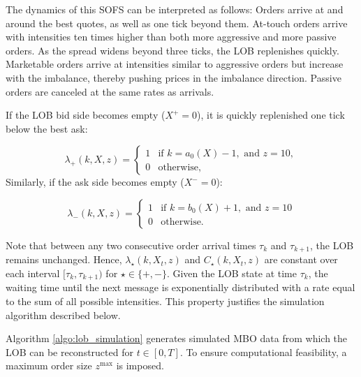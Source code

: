 \documentclass[10pt,a4paper,oneside]{article}
\providecommand{\DIFaddbegin}{} %
\providecommand{\DIFaddend}{} %
\providecommand{\DIFdelbegin}{} %
\providecommand{\DIFdelend}{} %
\newcommand{\DIFscaledelfig}{0.5}
\newlength{\DIFdelgraphicswidth} %
\newlength{\DIFdelgraphicsheight} %
\newcommand{\DIFaddincludegraphics}[2][]{{\color{blue}\fbox{\DIFOincludegraphics[#1]{#2}}}} %
\newcommand{\DIFdelincludegraphics}[2][]{%
\sbox{\DIFdelgraphicsbox}{\DIFOincludegraphics[#1]{#2}}%
\settoboxwidth{\DIFdelgraphicswidth}{\DIFdelgraphicsbox} %
\settoboxtotalheight{\DIFdelgraphicsheight}{\DIFdelgraphicsbox} %
\scalebox{\DIFscaledelfig}{%
\parbox[b]{\DIFdelgraphicswidth}{\usebox{\DIFdelgraphicsbox}\\[-\baselineskip] \rule{\DIFdelgraphicswidth}{0em}}\llap{\resizebox{\DIFdelgraphicswidth}{\DIFdelgraphicsheight}{%
\setlength{\unitlength}{\DIFdelgraphicswidth}%
\begin{picture}(1,1)%
\thicklines\linethickness{2pt} %
{\color[rgb]{1,0,0}\put(0,0){\framebox(1,1){}}}%
{\color[rgb]{1,0,0}\put(0,0){\line( 1,1){1}}}%
{\color[rgb]{1,0,0}\put(0,1){\line(1,-1){1}}}%
\end{picture}%
}\hspace*{3pt}}} %
} %
\DeclareRobustCommand{\DIFaddbegin}{\DIFOaddbegin \let\includegraphics\DIFaddincludegraphics} %
\DeclareRobustCommand{\DIFaddend}{\DIFOaddend \let\includegraphics\DIFOincludegraphics} %
\DeclareRobustCommand{\DIFdelbegin}{\DIFOdelbegin \let\includegraphics\DIFdelincludegraphics} %
\DeclareRobustCommand{\DIFdelend}{\DIFOaddend \let\includegraphics\DIFOincludegraphics} %
\begin{document}
The dynamics of this SOFS can be interpreted as follows: Orders arrive at and around the best quotes, as well as one tick beyond them. At-touch orders arrive with intensities ten times higher than both more aggressive and more passive orders. As the spread widens beyond three ticks, the LOB replenishes quickly. Marketable orders arrive at intensities similar to aggressive orders but increase with the imbalance, thereby pushing prices in the imbalance direction. Passive orders are canceled at the same rates as arrivals.


If the LOB bid side becomes empty ($X^+ = 0$), it is quickly replenished one tick below the best ask:

\[
    \lambda_+(k, X, z) =
    \begin{cases}
        1 & \text{if } k = a_0(X) - 1, \text{ and } z = 10, \\
        0 & \text{otherwise,}
    \end{cases}
\]
Similarly, if the ask side becomes empty ($X^- = 0$):

\[
    \lambda_-(k, X, z) =
    \DIFdelbegin %
\DIFdelend \DIFaddbegin \begin{cases}
        1 & \text{if } k = b_0(X) + 1, \text{ and } z = 10 \\
        0 & \text{otherwise.}
    \end{cases}\DIFaddend 
\]

Note that between any two consecutive order arrival times $\tau_k$ and $\tau_{k+1}$, the LOB remains unchanged. Hence, $\lambda_{\star}(k, X_t, z)$ and $C_{\star}(k, X_t, z)$ are constant over each interval $[\tau_k, \tau_{k+1})$ for $\star \in \{+, -\}$. Given the LOB state at time $\tau_k$, the waiting time until the next message is exponentially distributed with a rate equal to the sum of all possible intensities. This property justifies the simulation algorithm described below.

Algorithm \ref{algo:lob_simulation} generates simulated MBO data from which the LOB can be reconstructed for $t \in [0,T]$. To ensure computational feasibility, a maximum order size $z^{\max}$ is imposed.
\end{document}
